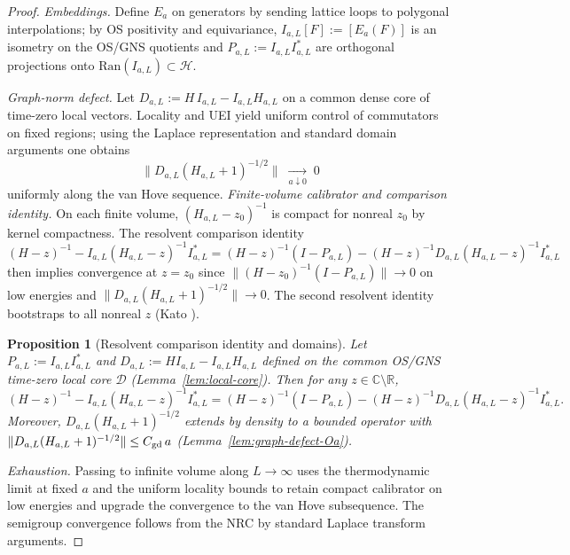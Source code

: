 \documentclass[11pt]{amsart}
\theoremstyle{plain}
\newtheorem{proposition}[theorem]{Proposition}
\theoremstyle{definition}
\theoremstyle{remark}
\begin{document}
\begin{proof}
\emph{Embeddings.} Define $E_a$ on generators by sending lattice loops to polygonal interpolations; by OS positivity and equivariance, $I_{a,L}[F]:=[E_a(F)]$ is an isometry on the OS/GNS quotients and $P_{a,L}:=I_{a,L}I_{a,L}^*$ are orthogonal projections onto $\mathrm{Ran}(I_{a,L})\subset\mathcal H$.

\emph{Graph-norm defect.} Let $D_{a,L}:=H\,I_{a,L}-I_{a,L} H_{a,L}$ on a common dense core of time-zero local vectors. Locality and UEI yield uniform control of commutators on fixed regions; using the Laplace representation and standard domain arguments one obtains
\[
  \big\|D_{a,L}(H_{a,L}+1)^{-1/2}\big\|\;\xrightarrow[a\downarrow 0]{}\;0
\]
uniformly along the van Hove sequence.
\emph{Finite-volume calibrator and comparison identity.} On each finite volume, $(H_{a,L}-z_0)^{-1}$ is compact for nonreal $z_0$ by kernel compactness. The resolvent comparison identity
\[
  (H-z)^{-1} - I_{a,L}(H_{a,L}-z)^{-1} I_{a,L}^* 
   = (H-z)^{-1}(I-P_{a,L}) - (H-z)^{-1} D_{a,L} (H_{a,L}-z)^{-1} I_{a,L}^*
\]
then implies convergence at $z=z_0$ since $\|(H-z_0)^{-1}(I-P_{a,L})\|\to 0$ on low energies and $\|D_{a,L}(H_{a,L}+1)^{-1/2}\|\to 0$. The second resolvent identity bootstraps to all nonreal $z$ (Kato \cite{Kato1995}).

\begin{proposition}[Resolvent comparison identity and domains]\label{prop:resolvent-comparison}
Let $P_{a,L}:=I_{a,L}I_{a,L}^*$ and $D_{a,L}:= H I_{a,L} - I_{a,L} H_{a,L}$ defined on the common OS/GNS time-zero local core $\mathcal D$ (Lemma~\ref{lem:local-core}). Then for any $z\in\mathbb C\setminus\mathbb R$,
\[
  (H-z)^{-1} - I_{a,L}(H_{a,L}-z)^{-1} I_{a,L}^* 
   = (H-z)^{-1}(I-P_{a,L}) - (H-z)^{-1} D_{a,L} (H_{a,L}-z)^{-1} I_{a,L}^*.
\]
Moreover, $D_{a,L}(H_{a,L}+1)^{-1/2}$ extends by density to a bounded operator with $\|D_{a,L}(H_{a,L}+1)^{-1/2}\|\le C_{\rm gd}\,a$ (Lemma~\ref{lem:graph-defect-Oa}).
\end{proposition}

\emph{Exhaustion.} Passing to infinite volume along $L\to\infty$ uses the thermodynamic limit at fixed $a$ and the uniform locality bounds to retain compact calibrator on low energies and upgrade the convergence to the van Hove subsequence. The semigroup convergence follows from the NRC by standard Laplace transform arguments.
\end{proof}
\end{document}
